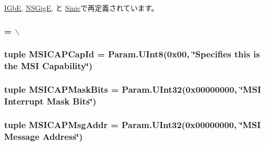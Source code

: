 \hyperlink{classEthernet_1_1IGbE_a1f3ebd5623021488fb0bfa84f5aa357d}{IGbE}, \hyperlink{classEthernet_1_1NSGigE_a1f3ebd5623021488fb0bfa84f5aa357d}{NSGigE}, と \hyperlink{classEthernet_1_1Sinic_a1f3ebd5623021488fb0bfa84f5aa357d}{Sinic}で再定義されています。\hypertarget{classPci_1_1PciDevice_a24a1a0fd62afea203b5edac13b589797}{
\subsubsection[{MSICAPBaseOffset}]{ = $\backslash$}}
\label{classPci_1_1PciDevice_a24a1a0fd62afea203b5edac13b589797}
\hypertarget{classPci_1_1PciDevice_a473ff2506f8dde521c6814195db00965}{
\subsubsection[{MSICAPCapId}]{\setlength{\rightskip}{0pt plus 5cm}tuple {\bf MSICAPCapId} = Param.UInt8(0x00, \char`\"{}Specifies this is the MSI Capability\char`\"{})}}
\label{classPci_1_1PciDevice_a473ff2506f8dde521c6814195db00965}
\hypertarget{classPci_1_1PciDevice_ac70a7d07fb7c0b750913e1d74fb9edf8}{
\subsubsection[{MSICAPMaskBits}]{\setlength{\rightskip}{0pt plus 5cm}tuple {\bf MSICAPMaskBits} = Param.UInt32(0x00000000, \char`\"{}MSI Interrupt Mask Bits\char`\"{})}}
\label{classPci_1_1PciDevice_ac70a7d07fb7c0b750913e1d74fb9edf8}
\hypertarget{classPci_1_1PciDevice_ab1a9538764c92af9e4b58fa1889c816a}{
\subsubsection[{MSICAPMsgAddr}]{\setlength{\rightskip}{0pt plus 5cm}tuple {\bf MSICAPMsgAddr} = Param.UInt32(0x00000000, \char`\"{}MSI Message Address\char`\"{})}}
